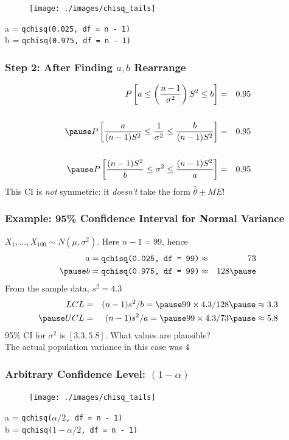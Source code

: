 \documentclass{beamer}
\begin{document}
\begin{frame}
\begin{figure}
\centering
\texttt{[image: ./images/chisq\_tails]}
\end{figure}

a = \texttt{qchisq(0.025, df = n - 1)} \\

b = \texttt{qchisq(0.975, df = n - 1)} 
\end{frame}

\begin{frame}
\frametitle{Step 2: After Finding $a,b$ Rearrange}
 	\begin{eqnarray*}
 		P\left[ a\leq   \left( \frac{n-1}{\sigma^2}\right)S^2 \leq b \right] &=& 0.95 \\ \\ \pause
 		P\left[ \frac{a}{(n-1)S^2}\leq  \frac{1}{\sigma^2} \leq \frac{b}{(n-1)S^2} \right] &=& 0.95 \\ \\ \pause
 				P\left[ \frac{(n-1)S^2}{b}\leq  \sigma^2 \leq \frac{(n-1)S^2}{a} \right] &=& 0.95
 	\end{eqnarray*}	
 	\pause
\alert{This CI is \emph{not} symmetric: it \emph{doesn't} take the form $\widehat{\theta} \pm ME$!}
\end{frame}

\begin{frame}
\frametitle{Example: 95\% Confidence Interval for Normal Variance}
$X_1, \hdots, X_{100} \sim N(\mu,\sigma^2)$. Here $n-1 = 99$, hence \pause
	\begin{eqnarray*}
		a = \texttt{qchisq(0.025, df = 99)} &\approx& 73\\ \pause
		b = \texttt{qchisq(0.975, df = 99)} &\approx& 128 \pause
	\end{eqnarray*}	
From the sample data, $s^2 = 4.3$
	\begin{eqnarray*}
		LCL &=& (n-1)s^2/b = \pause 99 \times 4.3/128 \pause \approx 3.3\\ \pause
		UCL &=& (n-1)s^2/a = \pause 99 \times 4.3/73 \pause \approx  5.8
	\end{eqnarray*}
	\pause
	\alert{95\% CI for $\sigma^2$ is $[3.3, 5.8]$. What values are plausible?}\\
	\pause
	The actual population variance in this case was 4
\end{frame}

\begin{frame}
\frametitle{Arbitrary Confidence Level: $(1-\alpha)$}

\begin{figure}
\centering
\texttt{[image: ./images/chisq\_tails]}
\end{figure}

a = \texttt{qchisq($\alpha/2$, df = n - 1)} \\

b = \texttt{qchisq($1-\alpha/2$, df = n - 1)} 
\end{frame}
\end{document}
